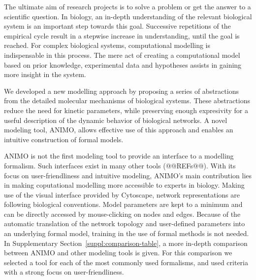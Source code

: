 The ultimate aim of research projects is to solve a problem or get
the answer to a scientific question. In biology, an in-depth understanding of
the relevant biological system is an important step towards this goal. Successive 
repetitions of the empirical cycle result in a stepwise increase in understanding,
until the goal is reached. For complex biological systems, computational modelling is 
indispensable in this process. The mere act of creating 
a computational model based on prior knowledge, experimental data and hypotheses 
assists in gaining more insight in the system. 


We developed a new modelling approach by proposing a series of abstractions from the detailed 
molecular mechanisms of biological systems. These abstractions reduce the need for kinetic 
parameters, while preserving enough expresivity for a useful description of the dynamic 
behavior of biological networks. A novel modeling tool, ANIMO, allows 
effective use of this approach and enables an intuitive construction of formal models.

ANIMO is not the first modeling tool to provide an interface to a
modelling formalism. Such interfaces exist in many other tools (@@REFs@@). With its
focus on user-friendliness and intuitive modeling, ANIMO's main contribution lies 
in making coputational modelling more accessible to experts in biology.
Making use of the visual
interface provided by Cytoscape, network representations are following biological conventions. 
Model parameters are kept to a minimum and can be directly accessed by mouse-clicking on 
nodes and edges. Because of the automatic translation of the network topology and 
user-defined parameters into an underlying formal model, training in the use of formal methods 
is not needed. In Supplementary Section~\ref{suppl:comparison-table}, a more in-depth
comparison between ANIMO and other modeling tools is given. For this comparison we selected a tool
for each of the most commonly used formalisms, and used criteria with a strong focus on 
user-friendliness.


